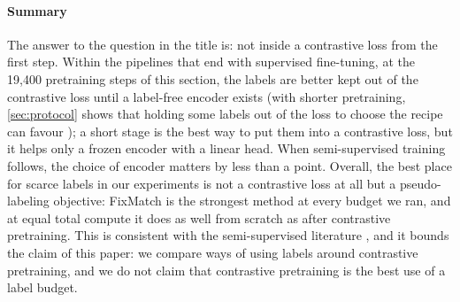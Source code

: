 \paragraph{Summary}
The answer to the question in the title is: not inside a contrastive loss from the first step. Within the pipelines that end with supervised
fine-tuning, at the 19,400 pretraining steps of this section, the labels are better kept out of the contrastive loss
until a label-free encoder exists (with shorter pretraining, \cref{sec:protocol} shows that holding some labels out of
the loss to choose the recipe can favour \supcon); a
short \supcon stage is the best way to put them into a contrastive loss, but it helps only a frozen encoder
with a linear head. When semi-supervised training
follows, the choice of encoder matters by less than a point. Overall, the best place for scarce labels in
our experiments is not a contrastive loss at all but a pseudo-labeling objective: FixMatch is the strongest
method at every budget we ran, and at equal total compute it does as well from scratch as after contrastive
pretraining. This is consistent with the semi-supervised
literature \citep{sohn2020fixmatch,li2021comatch,zheng2022simmatch,wang2022usb}, and it bounds the claim of
this paper: we compare ways of using labels around contrastive pretraining, and we do not claim that
contrastive pretraining is the best use of a label budget.
